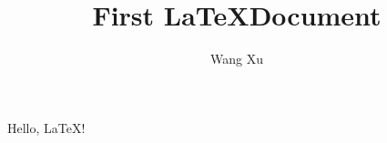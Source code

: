 \documentclass{article}
\title{First \LaTeX Document}
\author{Wang Xu}
\begin{document}
\maketitle

Hello, \LaTeX!
\end{document}
